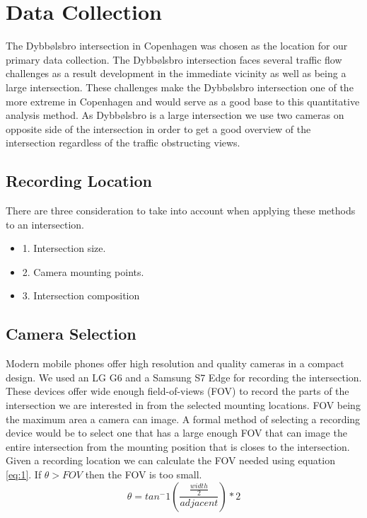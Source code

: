 \documentclass[
10pt, %
a4paper, %
oneside, %
headinclude,footinclude, %
] {book}%
\begin{document}
\section{Data Collection}

The Dybbølsbro intersection in Copenhagen was chosen as the location for our primary data collection. 
The Dybbølsbro intersection faces several traffic flow challenges as a result development in the immediate vicinity as well as being a large intersection.
These challenges make the Dybbølsbro intersection one of the more extreme in Copenhagen and would serve as a good base to this quantitative analysis method. 
As Dybbølsbro is a large intersection we use two cameras on opposite side of the intersection in order to get a good overview of the intersection regardless of the traffic obstructing views.

\subsection{Recording Location}

There are three consideration to take into account when applying these methods to an intersection.
\begin{itemize}
	\item1. Intersection size.
	\item2. Camera mounting points.
	\item3. Intersection composition
\end{itemize}

\subsection{Camera Selection}

Modern mobile phones offer high resolution and quality cameras in a compact design. We used an LG G6 and a Samsung S7 Edge for recording the intersection.
These devices offer wide enough field-of-views (FOV) to record the parts of the intersection we are interested in from the selected mounting locations.
FOV being the maximum area a camera can image. A formal method of selecting a recording device would be to select one that has a large enough FOV that can image the entire intersection 
from the mounting position that is closes to the intersection. Given a recording location we can calculate the FOV needed using equation \ref{eq:1}.
If $\theta > FOV$ then the FOV is too small.
\begin{equation}
    \theta = tan^-1(\frac{\frac{width}{2}}{adjacent}) * 2\label{eq:1}
  \end{equation}
\end{document}

